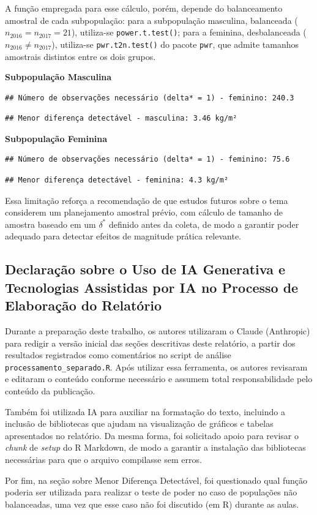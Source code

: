\documentclass[
]{article}
\begin{document}
A função empregada para esse cálculo, porém, depende do balanceamento amostral de cada subpopulação: para a subpopulação masculina, balanceada (\(n_{2016} = n_{2017} = 21\)), utiliza-se \texttt{power.t.test()}; para a feminina, desbalanceada (\(n_{2016} \neq n_{2017}\)), utiliza-se \texttt{pwr.t2n.test()} do pacote \texttt{pwr}, que admite tamanhos amostrais distintos entre os dois grupos.

\textbf{Subpopulação Masculina}

\begin{verbatim}
## Número de observações necessário (delta* = 1) - feminino: 240.3
\end{verbatim}

\begin{verbatim}
## Menor diferença detectável - masculina: 3.46 kg/m²
\end{verbatim}

\textbf{Subpopulação Feminina}

\begin{verbatim}
## Número de observações necessário (delta* = 1) - feminino: 75.6
\end{verbatim}

\begin{verbatim}
## Menor diferença detectável - feminina: 4.3 kg/m²
\end{verbatim}

Essa limitação reforça a recomendação de que estudos futuros sobre o tema considerem um planejamento amostral prévio, com cálculo de tamanho de amostra baseado em um \(\delta^*\) definido antes da coleta, de modo a garantir poder adequado para detectar efeitos de magnitude prática relevante.

\subsection{Declaração sobre o Uso de IA Generativa e Tecnologias Assistidas por IA no Processo de Elaboração do Relatório}\label{declarauxe7uxe3o-sobre-o-uso-de-ia-generativa-e-tecnologias-assistidas-por-ia-no-processo-de-elaborauxe7uxe3o-do-relatuxf3rio}

Durante a preparação deste trabalho, os autores utilizaram o Claude (Anthropic) para redigir a versão inicial das seções descritivas deste relatório, a partir dos resultados registrados como comentários no script de análise \texttt{processamento\_separado.R}. Após utilizar essa ferramenta, os autores revisaram e editaram o conteúdo conforme necessário e assumem total responsabilidade pelo conteúdo da publicação.

Também foi utilizada IA para auxiliar na formatação do texto, incluindo a inclusão de bibliotecas que ajudam na visualização de gráficos e tabelas apresentados no relatório. Da mesma forma, foi solicitado apoio para revisar o \emph{chunk} de \emph{setup} do R Markdown, de modo a garantir a instalação das bibliotecas necessárias para que o arquivo compilasse sem erros.

Por fim, na seção sobre Menor Diferença Detectável, foi questionado qual função poderia ser utilizada para realizar o teste de poder no caso de populações não balanceadas, uma vez que esse caso não foi discutido (em R) durante as aulas.
\end{document}
